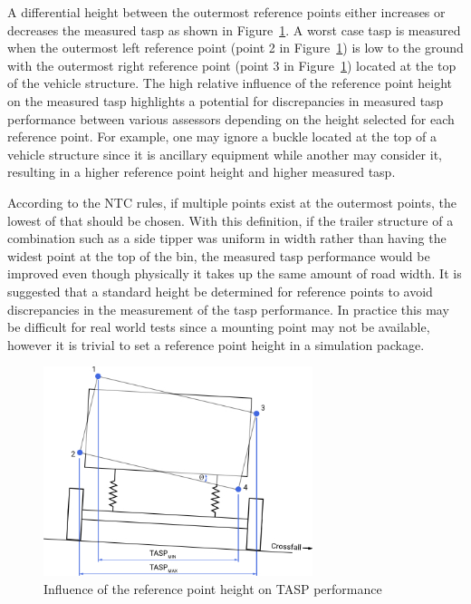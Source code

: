 A differential height between the outermost reference points either increases or decreases the measured \gls{tasp} as shown in Figure~\ref{figure:influence-of-reference-point-height-on-tasp}. A worst case \gls{tasp} is measured when the outermost left reference point (point 2 in Figure~\ref{figure:influence-of-reference-point-height-on-tasp}) is low to the ground with the outermost right reference point (point 3 in Figure~\ref{figure:influence-of-reference-point-height-on-tasp}) located at the top of the vehicle structure. The high relative influence of the reference point height on the measured \gls{tasp} highlights a potential for discrepancies in measured \gls{tasp} performance between various assessors depending on the height selected for each reference point. For example, one may ignore a buckle located at the top of a vehicle structure since it is ancillary equipment while another may consider it, resulting in a higher reference point height and higher measured \gls{tasp}.

According to the NTC rules, if multiple points exist at the outermost points, the lowest of that should be chosen. With this definition, if the trailer structure of a combination such as a side tipper was uniform in width rather than having the widest point at the top of the bin, the measured \gls{tasp} performance would be improved even though physically it takes up the same amount of road width. It is suggested that a standard height be determined for reference points to avoid discrepancies in the measurement of the \gls{tasp} performance. In practice this may be difficult for real world tests since a mounting point may not be available, however it is trivial to set a reference point height in a simulation package. 

\begin{figure}[H]
	\centering
	\includegraphics[width=0.7\textwidth]{fig/tasp_reference-point-height-influence}
	\caption{Influence of the reference point height on TASP performance}
	\label{figure:influence-of-reference-point-height-on-tasp}
\end{figure}

